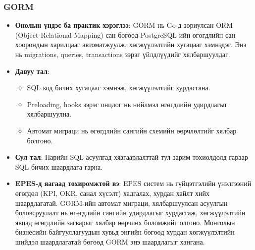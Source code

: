 \subsubsection{GORM}
\begin{itemize}
    \item \textbf{Онолын үндэс ба практик хэрэглээ}: GORM нь Go-д зориулсан ORM (Object-Relational Mapping) сан бөгөөд PostgreSQL-ийн өгөгдлийн сан хоорондын 
    харилцааг автоматжуулж, хөгжүүлэлтийн хугацааг хэмнэдэг. Энэ нь migrations, queries, transactions зэрэг үйлдлүүдийг хялбаршуулдаг.
    \item \textbf{Давуу тал}:
    \begin{itemize}
        \item SQL код бичих хугацааг хэмнэж, хөгжүүлэлтийг хурдасгана.
        \item Preloading, hooks зэрэг онцлог нь нийлмэл өгөгдлийн удирдлагыг хялбаршуулна.
        \item Автомат миграци нь өгөгдлийн сангийн схемийн өөрчлөлтийг хялбар болгоно.
    \end{itemize}
    \item \textbf{Сул тал}: Нарийн SQL асуулгад хязгаарлалттай тул зарим тохиолдолд гараар SQL бичих шаардлага гарна.
    \item \textbf{EPES-д яагаад тохиромжтой вэ}: EPES систем нь гүйцэтгэлийн үнэлгээний өгөгдөл (KPI, OKR, санал хүсэлт) хадгалах, хурдан хайлт хийх 
    шаардлагатай. GORM-ийн автомат миграци, хялбаршуулсан асуулгын боловсруулалт нь өгөгдлийн сангийн удирдлагыг хурдасгаж, хөгжүүлэлтийн явцад өгөгдлийн 
    загварыг хялбар өөрчлөх боломжийг олгоно. Монголын бизнесийн байгууллагуудын хувьд энгийн бөгөөд хурдан хөгжүүлэлтийн шийдэл шаардлагатай бөгөөд GORM 
    энэ шаардлагыг хангана.
\end{itemize}

